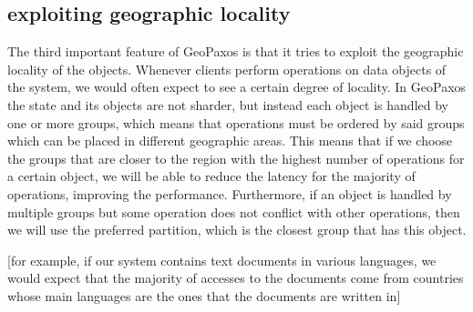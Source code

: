 \subsection{exploiting geographic locality}
The third important feature of GeoPaxos is that it tries to exploit the geographic locality of the objects. Whenever clients perform operations on data objects of the system, we would often expect to see a certain degree of locality. In GeoPaxos the state and its objects are not sharder, but instead each object is handled by one or more groups, which means that operations must be ordered by said groups which can be placed in different geographic areas. This means that if we choose the groups that are closer to the region with the highest number of operations for a certain object, we will be able to reduce the latency for the majority of operations, improving the performance. Furthermore, if an object is handled by multiple groups but some operation does not conflict with other operations, then we will use the preferred partition, which is the closest group that has this object.

[for example, if our system contains text documents in various languages, we would expect that the majority of accesses to the documents come from countries whose main languages are the ones that the documents are written in]

